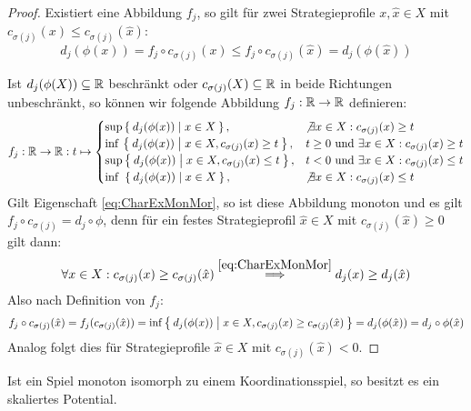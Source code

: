 \begin{proof}
	Existiert eine Abbildung $f_j$, so gilt für zwei Strategieprofile $x, \hat{x} \in X$ mit $c_{\sigma(j)}(x) \leq c_{\sigma(j)}(\hat{x})$:
		\[d_j(\phi(x)) = f_j\circ c_{\sigma(j)}(x) \leq f_j\circ c_{\sigma(j)}(\hat{x}) = d_j(\phi(\hat{x}))\]
		
	Ist $d_j(\phi(X)) \subseteq \mathbb{R}$ beschränkt oder $c_{\sigma(j)}(X) \subseteq \mathbb{R}$ in beide Richtungen unbeschränkt, so können wir folgende Abbildung $f_j: \mathbb{R} \to \mathbb{R}$ definieren:
		\[f_j: \mathbb{R} \to \mathbb{R}: t \mapsto \begin{cases}
			\sup \Set{d_j(\phi(x)) | x \in X},								&\not\exists x \in X: c_{\sigma(j)}(x) \geq t \\
			\inf\, \Set{d_j(\phi(x)) | x \in X, c_{\sigma(j)}(x) \geq t}, 	&t \geq 0 \text{ und } \exists x \in X: c_{\sigma(j)}(x) \geq t\\
			\sup \Set{d_j(\phi(x)) | x \in X, c_{\sigma(j)}(x) \leq t}, 	&t <    0 \text{ und } \exists x \in X: c_{\sigma(j)}(x) \leq t\\
			\inf\,\, \Set{d_j(\phi(x)) | x \in X},							&\not\exists x \in X: c_{\sigma(j)}(x) \leq t 
		\end{cases} \]
	Gilt Eigenschaft \eqref{eq:CharExMonMor}, so ist diese Abbildung monoton und es gilt $f_j\circ c_{\sigma(j)} = d_j \circ \phi$, denn für ein festes Strategieprofil $\hat{x} \in X$ mit $c_{\sigma(j)}(\hat{x}) \geq 0$ gilt dann:
		\[\forall x \in X: c_{\sigma(j)}(x) \geq c_{\sigma(j)}(\hat{x}) \overset{\eqref{eq:CharExMonMor}}{\implies} d_j(x) \geq d_j(\hat{x}) \]
	Also nach Definition von $f_j$:
		\[f_j \circ c_{\sigma(j)}(\hat{x}) = f_j (c_{\sigma(j)}(\hat{x})) = \inf\Set{d_j(\phi(x)) | x \in X, c_{\sigma(j)}(x) \geq c_{\sigma(j)}(\hat{x}) }= d_j(\phi(\hat{x})) = d_j\circ \phi(\hat{x})\]
	Analog folgt dies für Strategieprofile $\hat{x} \in X$ mit $c_{\sigma(j)}(\hat{x}) < 0$.
\end{proof}

\begin{prop}
	Ist ein Spiel monoton isomorph zu einem Koordinationsspiel, so besitzt es ein skaliertes Potential.
\end{prop}

